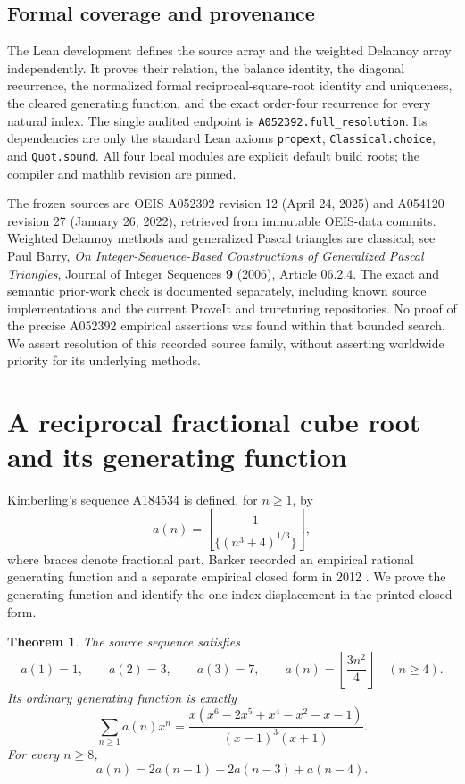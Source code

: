 \documentclass[11pt]{article}
\newtheorem{theorem}{Theorem}[section]
\begin{document}
\subsection{Formal coverage and provenance}

The Lean development defines the source array and the weighted Delannoy
array independently. It proves their relation, the balance identity,
the diagonal recurrence, the normalized formal reciprocal-square-root
identity and uniqueness, the cleared generating function, and the exact
order-four recurrence for every natural index. The single audited
endpoint is \texttt{A052392.full\_resolution}. Its dependencies are only
the standard Lean axioms \texttt{propext}, \texttt{Classical.choice}, and
\texttt{Quot.sound}. All four local modules are explicit default build
roots; the compiler and mathlib revision are pinned.

The frozen sources are OEIS A052392 revision 12 (April 24, 2025) and
A054120 revision 27 (January 26, 2022), retrieved from immutable
OEIS-data commits. Weighted Delannoy methods and generalized Pascal
triangles are classical; see Paul Barry, \emph{On Integer-Sequence-Based
Constructions of Generalized Pascal Triangles}, Journal of Integer
Sequences \textbf{9} (2006), Article 06.2.4. The exact and semantic
prior-work check is documented separately, including known source
implementations and the current ProveIt and trureturing repositories.
No proof of the precise A052392 empirical assertions was found within
that bounded search. We assert resolution of this recorded source
family, without asserting worldwide priority for its underlying methods.


\section{A reciprocal fractional cube root and its generating function}

Kimberling's sequence A184534 is defined, for $n\ge1$, by
\[
 a(n)=\left\lfloor\frac1{\{(n^3+4)^{1/3}\}}\right\rfloor,
\]
where braces denote fractional part. Barker recorded an empirical rational
generating function and a separate empirical closed form in 2012
\cite{oeis184534}. We prove the generating function and identify the
one-index displacement in the printed closed form.

\begin{theorem}
The source sequence satisfies
\[
 a(1)=1,\qquad a(2)=3,\qquad a(3)=7,\qquad
 a(n)=\left\lfloor\frac{3n^2}{4}\right\rfloor\quad(n\ge4).
\]
Its ordinary generating function is exactly
\begin{equation}\label{a184534:gf}
 \sum_{n\ge1}a(n)x^n=
 \frac{x(x^6-2x^5+x^4-x^2-x-1)}{(x-1)^3(x+1)}.
\end{equation}
For every $n\ge8$,
\[
 a(n)=2a(n-1)-2a(n-3)+a(n-4).
\]
\end{theorem}
\end{document}
